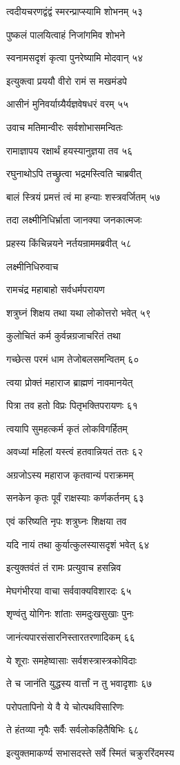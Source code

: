 त्वदीयचरणद्वंद्वं स्मरन्प्राप्स्यामि शोभनम् ५३

पुष्कलं पालयित्वाहं निजांगमिव शोभने

स्वनामसदृशं कृत्वा पुनरेष्यामि मोदवान् ५४

इत्युक्त्वा प्रययौ वीरो रामं स मखमंडपे

आसीनं मुनिवर्याग्र्यैर्यज्ञवेषधरं वरम् ५५

उवाच मतिमान्वीरः सर्वशोभासमन्वितः

रामाज्ञापय रक्षार्थं हयस्यानुज्ञया तव ५६

रघुनाथोऽपि तच्छ्रुत्वा भद्रमस्त्विति चाब्रवीत्

बालं स्त्रियं प्रमत्तं त्वं मा हन्याः शस्त्रवर्जितम् ५७

तदा लक्ष्मीनिधिर्भ्राता जानक्या जनकात्मजः

प्रहस्य किंचिन्नयने नर्तयन्राममब्रवीत् ५८

लक्ष्मीनिधिरुवाच

रामचंद्र महाबाहो सर्वधर्मपरायण

शत्रुघ्नं शिक्षय तथा यथा लोकोत्तरो भवेत् ५९

कुलोचितं कर्म कुर्वन्नग्रजाचरितं तथा

गच्छेत्स परमं धाम तेजोबलसमन्वितम् ६०

त्वया प्रोक्तं महाराज ब्राह्मणं नावमानयेत्

पित्रा तव हतो विप्रः पितृभक्तिपरायणः ६१

त्वयापि सुमहत्कर्म कृतं लोकविगर्हितम्

अवध्यां महिलां यस्त्वं हतवान्नियतं ततः ६२

अग्रजोऽस्य महाराज कृतवान्यं पराक्रमम्

सनकेन कृतः पूर्वं राक्षस्याः कर्णकर्तनम् ६३

एवं करिष्यति नृपः शत्रुघ्नः शिक्षया तव

यदि नायं तथा कुर्यात्कुलस्यासदृशं भवेत् ६४

इत्युक्तवंतं तं रामः प्रत्युवाच हसन्निव

मेघगंभीरया वाचा सर्ववाक्यविशारदः ६५

शृण्वंतु योगिनः शांताः समदुःखसुखाः पुनः

जानंत्यपारसंसारनिस्तारतरणादिकम् ६६

ये शूराः समहेष्वासाः सर्वशस्त्रास्त्रकोविदाः

ते च जानंति युद्धस्य वार्त्तां न तु भवादृशाः ६७

परोपतापिनो ये वै ये चोत्पथविसारिणः

ते हंतव्या नृपैः सर्वैः सर्वलोकहितैषिभिः ६८

इत्युक्तमाकर्ण्य सभासदस्ते सर्वे स्मितं चक्रुररिंदमस्य

